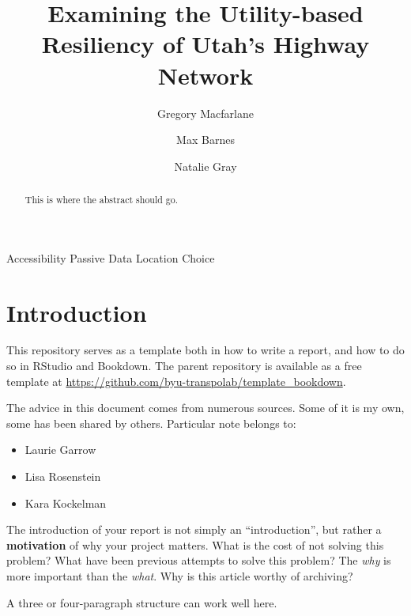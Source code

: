 \documentclass[3p, authoryear]{elsarticle} %
\providecommand{\tightlist}{%
  \setlength{\itemsep}{0pt}\setlength{\parskip}{0pt}}
\begin{document}
\begin{frontmatter}

  \title{Examining the Utility-based Resiliency of Utah's Highway Network}
    \author[Brigham Young University]{Gregory Macfarlane}
    \author[Brigham Young University]{Max Barnes}
    \author[Brigham Young University]{Natalie Gray}
      \address[Brigham Young University]{Civil and Environmental Engineering Department, 430 Engineering Building, Provo, Utah 84602}
    \address[Another University]{Some Other Place}
  
  \begin{abstract}
  This is where the abstract should go.
  \end{abstract}
   \begin{keyword} Accessibility Passive Data Location Choice\end{keyword}
 \end{frontmatter}

\hypertarget{intro}{%
\section{Introduction}\label{intro}}

This repository serves as a template both in how to write a report, and how
to do so in RStudio and Bookdown. The parent repository is available as a free
template at \url{https://github.com/byu-transpolab/template_bookdown}.

The advice in this document comes from numerous sources. Some of it is my own, some
has been shared by others. Particular note belongs to:

\begin{itemize}
\tightlist
\item
  Laurie Garrow
\item
  Lisa Rosenstein
\item
  Kara Kockelman
\end{itemize}

The introduction of your report is not simply an ``introduction'', but rather a
\textbf{motivation} of why your project matters. What is the cost of not solving
this problem? What have been previous attempts to solve this problem? The \emph{why}
is more important than the \emph{what}. Why is this article worthy of archiving?

A three or four-paragraph structure can work well here.
\end{document}
